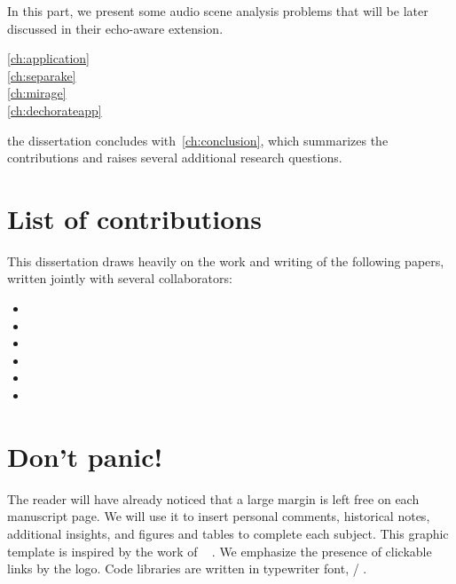 In this part, we present some audio scene analysis problems that will be later discussed in their echo-aware extension.

\begin{description}
\item[\cref{ch:application}]\synopsisChApplication
\item[\cref{ch:separake}]\synopsisChSeparake
\item[\cref{ch:mirage}]\synopsisChMirage
\item[\cref{ch:dechorateapp}]\synopsisChDecharateApp
\end{description}

 the dissertation concludes with~\cref{ch:conclusion}, which summarizes the contributions and raises several additional research questions.

\newpage
\section{List of contributions}
This dissertation draws heavily on the work and writing of the following papers, written jointly with several collaborators:

\begin{itemize}
    \item {}
    \item {}
    \item {}
    \item {}
    \item {}
    \item {}
\end{itemize}

\newpage
\section{Don't panic!}
The reader will have already noticed that a large margin is left free on each manuscript page.
We will use it to insert personal comments, historical notes, additional insights, and figures and tables to complete each subject.
This graphic template is inspired by the work of \citeauthor{tufte1983visual}~
.
We emphasize the presence of clickable links by the \ExternalLink logo.
Code libraries are written in typewriter font, \eg/ .

